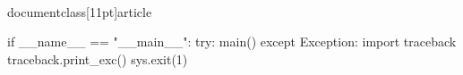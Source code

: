 \\documentclass[11pt]{article}
\begin{document}
\begin{CodeBlock}
if __name__ == "__main__":
    try:
        main()
    except Exception:
        import traceback
        traceback.print_exc()
        sys.exit(1)

\end{CodeBlock}
\end{document}
